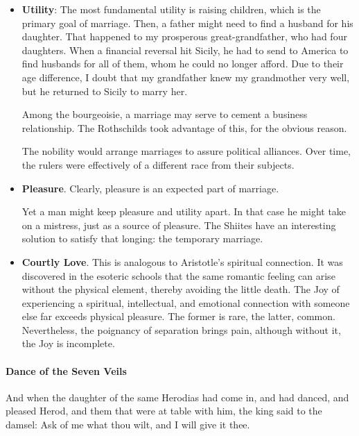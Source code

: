 \begin{itemize}


\item \textbf{Utility}: The most fundamental utility is raising children, which is the primary goal of marriage. Then, a father might need to find a husband for his daughter. That happened to my prosperous great-grandfather, who had four daughters. When a financial reversal hit Sicily, he had to send to America to find husbands for all of them, whom he could no longer afford. Due to their age difference, I doubt that my grandfather knew my grandmother very well, but he returned to Sicily to marry her.

Among the bourgeoisie, a marriage may serve to cement a business relationship. The Rothschilds took advantage of this, for the obvious reason.

The nobility would arrange marriages to assure political alliances. Over time, the rulers were effectively of a different race from their subjects.

\item \textbf{Pleasure}. Clearly, pleasure is an expected part of marriage.

Yet a man might keep pleasure and utility apart. In that case he might take on a mistress, just as a source of pleasure. The Shiites have an interesting solution to satisfy that longing: the temporary marriage.

\item \textbf{Courtly Love}. This is analogous to Aristotle's spiritual connection. It was discovered in the esoteric schools that the same romantic feeling can arise without the physical element, thereby avoiding the little death. The Joy of experiencing a spiritual, intellectual, and emotional connection with someone else far exceeds physical pleasure. The former is rare, the latter, common. Nevertheless, the poignancy of separation brings pain, although without it, the Joy is incomplete.
\end{itemize}


\paragraph{Dance of the Seven Veils}


\begin{quotex}
And when the daughter of the same Herodias had come in, and had danced, and pleased Herod, and them that were at table with him, the king said to the damsel: Ask of me what thou wilt, and I will give it thee.
\end{quotex}


